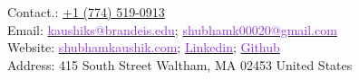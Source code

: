 Contact.\:: \href{tel:+17745190913}{+1 (774) 519-0913}\\ Email:
\href{mailto:kaushiks@brandeis.edu}{\textcolor{blueviolet}{kaushiks@brandeis.edu}}\;;
\href{mailto:shubhamk00020@gmail.com}{\textcolor{blueviolet}{shubhamk00020@gmail.com}}\\
Website:
\href{https://www.shubhamkaushik.com}{\textcolor{blueviolet}{shubhamkaushik.com}}\;;
\href{https://www.linkedin.com/in/shubham-sudo}{\textcolor{blueviolet}{Linkedin}}\;;
\href{https://www.github.com/shubham-sudo}{\textcolor{blueviolet}{Github}}\\
Address: 415 South Street Waltham, MA 02453 United States
